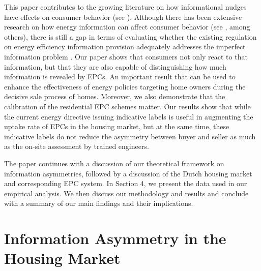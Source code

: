 \documentclass[12pt]{article}
\begin{document}
This paper contributes to the growing literature on how informational nudges have effects on consumer behavior (see \citealp{allcott2016role, camerer2003regulation, thaler2003libertarian}). Although there has been extensive research on how energy information can affect consumer behavior (see \citealp{allcott2011social, momsen2014intention, codagnone2016labels}, among others), there is still a gap in terms of evaluating whether the existing regulation on energy efficiency information provision adequately addresses the imperfect information problem \citep{allcott2016paternalism}. Our paper shows that consumers not only react to that information, but that they are also capable of distinguishing how much information is revealed by EPCs. An important result that can be used to enhance the effectiveness of energy policies targeting home owners during the decisive sale process of homes. Moreover, we also demonstrate that the calibration of the residential EPC schemes matter. Our results show that while the current energy directive issuing indicative labels is useful in augmenting the uptake rate of EPCs in the housing market, but at the same time, these indicative labels do not reduce the asymmetry between buyer and seller as much as the on-site assessment by trained engineers.

The paper continues with a discussion of our theoretical framework on information asymmetries, followed by a discussion of the Dutch housing market and corresponding EPC system. In Section 4, we present the data used in our empirical analysis. We then discuss our methodology and results and conclude with a summary of our main findings and their implications.

\section{Information Asymmetry in the Housing Market} 
\end{document}
